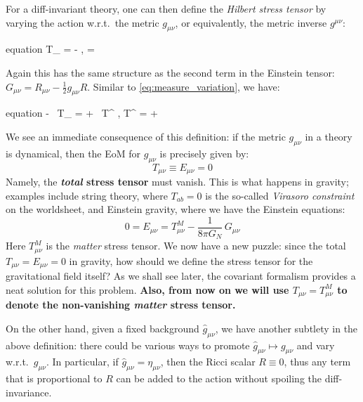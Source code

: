 \documentclass[a4paper
	,10pt
]{article}
\begin{document}
	For a diff-invariant theory, one can then define the \textit{Hilbert stress tensor} by varying the action w.r.t.~the metric $g_{\mu\nu}$, or equivalently, the metric inverse $g^{\mu\nu}$:
	\begin{empheq}{equation}
		T_{\mu\nu}
		= - 
			,
	\quad
		= \int {}  
	\end{empheq}
	Again this has the same structure as the second term in the Einstein tensor: $
		G_{\mu\nu}
		= R_{\mu\nu} - \frac{1}{2} g_{\mu\nu} R
	$. 
	Similar to \eqref{eq:measure_variation}, we have:
	\begin{empheq}{equation}
		- \, T_{\mu\nu}
		= + \, T^{\mu\nu}
			,
	\quad
		T^{\mu\nu}
		= + 
	\end{empheq}
	
	We see an immediate consequence of this definition: if the metric $g_{\mu\nu}$ in a theory is dynamical, then the EoM for $g_{\mu\nu}$ is precisely given by:
	\begin{equation}
		T_{\mu\nu} \equiv E_{\mu\nu} = 0
	\end{equation}
\pagebreak[3]%
	Namely, the \textbf{\textit{total} stress tensor} must vanish. This is what happens in gravity; examples include string theory, where $T_{ab} = 0$ is the so-called \textit{Virasoro constraint} on the worldsheet, and Einstein gravity, where we have the Einstein equations:
	\begin{equation}
		0 = E_{\mu\nu}
		= T^M_{\mu\nu}
			- \frac{1}{8\pi G_N}\,G_{\mu\nu}
	\end{equation}
	Here $T^M_{\mu\nu}$ is the \textit{matter} stress tensor. We now have a new puzzle: since the total $T_{\mu\nu} = E_{\mu\nu} = 0$ in gravity, how should we define the stress tensor for the gravitational field itself? As we shall see later, the covariant formalism provides a neat solution for this problem. \textbf{Also, from now on we will use $T_{\mu\nu} = T^M_{\mu\nu}$ to denote the non-vanishing \textit{matter} stress tensor.} 
	
	\newparagraph
	On the other hand, given a fixed background $\hat{g}_{\mu\nu}$, we have another subtlety in the above definition: there could be various ways to promote $
		\hat{g}_{\mu\nu} \mapsto
		g_{\mu\nu}
	$ and vary w.r.t.\ $g_{\mu\nu}$. In particular, if $\hat{g}_{\mu\nu} = \eta_{\mu\nu}$, then the Ricci scalar $R \equiv 0$, thus any term that is proportional to $R$ can be added to the action without spoiling the diff-invariance. 
	
\end{document}
